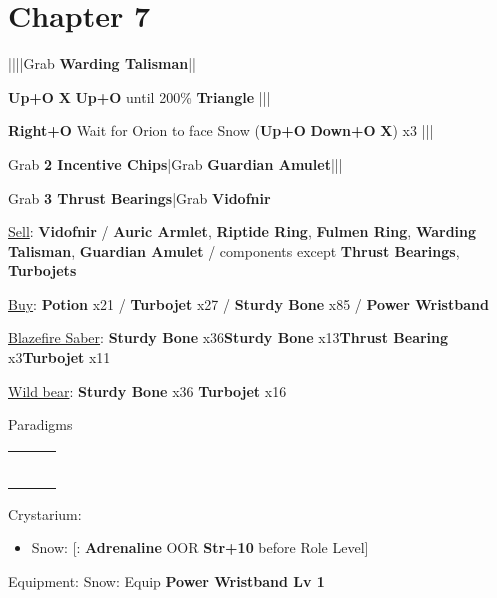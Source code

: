 \section{Chapter 7}
\begin{mainlist}
	\item {}|\skip|\skip|\skip|Grab \textbf{Warding Talisman}|\skip|
	\item {} \textbf{Up+O} \to \textbf{X} \to \textbf{Up+O} until 200\% \to \textbf{Triangle} |\skip||
	\item {} \textbf{Right+O} \to Wait for Orion to face Snow \to (\textbf{Up+O} \to \textbf{Down+O} \to \textbf{X}) x3 |\skip||
	\item Grab \textbf{2 Incentive Chips}|Grab \textbf{Guardian Amulet}|\skip||\skip
	\item Grab \textbf{3 Thrust Bearings}|Grab \textbf{Vidofnir}
\end{mainlist}
\begin{shop}{\shopitem}
	\item \underline{Sell}: \textbf{Vidofnir} / \textbf{Auric Armlet}, \textbf{Riptide Ring}, \textbf{Fulmen Ring}, \textbf{Warding Talisman}, \textbf{Guardian Amulet} / components except \textbf{Thrust Bearings}, \textbf{Turbojets}
	\item \underline{Buy}: \textbf{Potion} x21 / \textbf{Turbojet} x27 / \textbf{Sturdy Bone} x85 / \textbf{Power Wristband}
\end{shop}
\begin{upgrade}
	\item \underline{Blazefire Saber}: \textbf{Sturdy Bone} x36\to\textbf{Sturdy Bone} x13\to\textbf{Thrust Bearing} x3\to\textbf{Turbojet} x11
	\item \underline{Wild bear}: \textbf{Sturdy Bone} x36 \to \textbf{Turbojet} x16
\end{upgrade}
\begin{menu}
	\item Paradigms
	\begin{tabular}{ccl}
		\com          & \rav &  \\
		\com          & \med &          \\
		\sen          & \med &          \\
		\sen          & \syn &          \\
		\mkrole{\rav} & \rav &          \\
		\mkrole{\rav} & \rav &
	\end{tabular}
	\item Crystarium:
	\begin{itemize}
		\item Snow: [\com: \textbf{Adrenaline} OOR \to \textbf{Str+10} before Role Level]
	\end{itemize}
	\item Equipment: Snow: Equip \textbf{Power Wristband Lv 1}
\end{menu}
